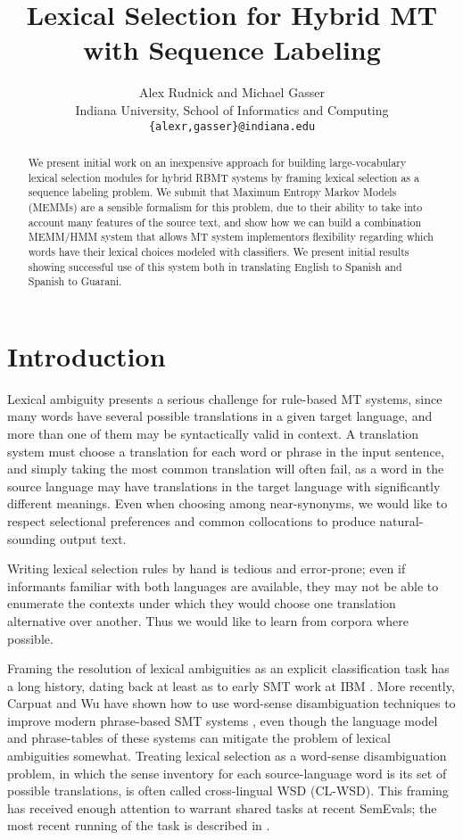 \documentclass[11pt]{article}
\title{Lexical Selection for Hybrid MT with Sequence Labeling}
\author{Alex Rudnick and Michael Gasser\\
        Indiana University, School of Informatics and Computing \\
        {\tt \{alexr,gasser\}@indiana.edu}}
\date{}
\begin{document}
\maketitle
\begin{abstract}
We present initial work on an inexpensive approach for building
large-vocabulary lexical selection modules for hybrid RBMT systems by framing
lexical selection as a sequence labeling problem. We submit that Maximum
Entropy Markov Models (MEMMs) are a sensible formalism for this problem, due to
their ability to take into account many features of the source text, and show
how we can build a combination MEMM/HMM system that allows MT system
implementors flexibility regarding which words have their lexical choices
modeled with classifiers. We present initial results showing successful use of
this system both in translating English to Spanish and Spanish to Guarani.
\end{abstract}

\section{Introduction}
Lexical ambiguity presents a serious challenge for rule-based MT systems, since
many words have several possible translations in a given target language, and
more than one of them may be syntactically valid in context. A translation
system must choose a translation for each word or phrase in the input sentence,
and simply taking the most common translation will often fail, as a word in the
source language may have translations in the target language with significantly
different meanings. Even when choosing among near-synonyms, we would like to
respect selectional preferences and common collocations to produce
natural-sounding output text.

Writing lexical selection rules by hand is tedious and error-prone; even if
informants familiar with both languages are available, they may not be able to
enumerate the contexts under which they would choose one translation
alternative over another. Thus we would like to learn from corpora where
possible. 

Framing the resolution of lexical ambiguities as an explicit classification
task has a long history, dating back at least as to early SMT work at IBM
\cite{Brown91word-sensedisambiguation}.  More recently, Carpuat and Wu have
shown how to use word-sense disambiguation techniques to improve modern
phrase-based SMT systems \cite{carpuatpsd}, even though the language model and
phrase-tables of these systems can mitigate the problem of lexical ambiguities
somewhat. Treating lexical selection as a word-sense disambiguation problem, in
which the sense inventory for each source-language word is its set of possible
translations, is often called cross-lingual WSD (CL-WSD). This framing has
received enough attention to warrant shared tasks at recent SemEvals; the most
recent running of the task is described in \cite{task10}.
\end{document}
